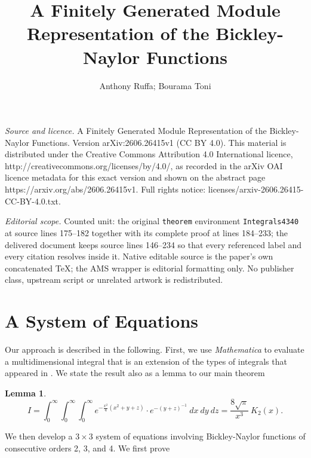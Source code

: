\documentclass[10pt,a4paper]{amsart}
\newtheorem{lemma}{Lemma}
\begin{document}
\title[A Finitely Generated Module Representation of the Bickley-Na]{A Finitely Generated Module Representation of the Bickley-Naylor Functions}
\author{Anthony Ruffa; Bourama Toni}
\date{}
\maketitle
\noindent\emph{Source and licence.} A Finitely Generated Module Representation of the Bickley-Naylor Functions. Version arXiv:2606.26415v1 (CC BY 4.0). This material is distributed under the Creative Commons Attribution 4.0 International licence, http://creativecommons.org/licenses/by/4.0/, as recorded in the arXiv OAI licence metadata for this exact version and shown on the abstract page https://arxiv.org/abs/2606.26415v1. Full rights notice: licenses/arxiv-2606.26415-CC-BY-4.0.txt.\par\smallskip
\noindent\textit{Editorial scope.} Counted unit: the original \texttt{theorem} environment \texttt{Integrals4340} at source lines 175--182 together with its complete proof at lines 184--233; the delivered document keeps source lines 146--234 so that every referenced label and every citation resolves inside it. Native editable source is the paper's own concatenated TeX; the AMS wrapper is editorial formatting only. No publisher class, upstream script or unrelated artwork is redistributed.
\section{A System of Equations}

Our approach is described in the following. First, we use \emph{Mathematica} to evaluate a multidimensional integral that is an extension of the types of integrals that appeared in \cite{Ruffa2024}. We state the result also as a lemma to our main theorem

\begin{lemma}

\begin{equation}
I
=
\int_0^\infty
\int_0^\infty
\int_0^\infty
e^{
-\frac{x^2}{4}
(x^2+y+z)
}\cdot
e^{-(y+z)^{-1}}\:
dx\:dy\:dz
=
\frac{8\sqrt{\pi}}{x^3}\:
K_2(x).
\label{Integrals4340a}
\end{equation}

\end{lemma}


We then develop a $3\times 3$ system of equations involving Bickley-Naylor functions of consecutive orders 2, 3, and 4. We first prove
\end{document}
